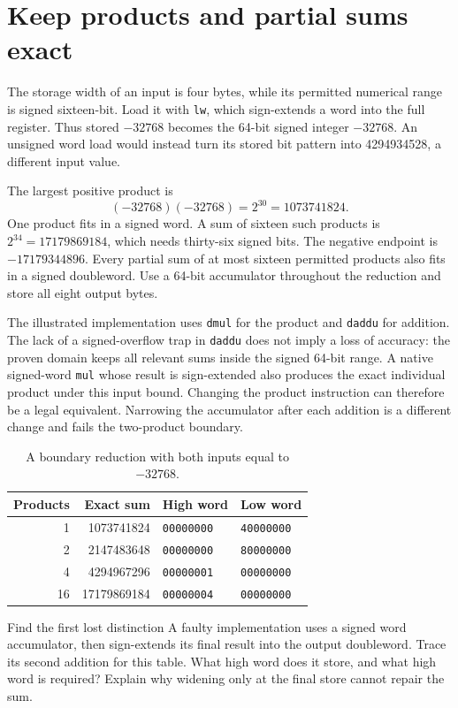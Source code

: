 \section{Keep products and partial sums exact}
The storage width of an input is four bytes, while its permitted numerical range
is signed sixteen-bit. Load it with \texttt{lw}, which sign-extends a word into
the full register. Thus stored \(-32768\) becomes the 64-bit signed integer
\(-32768\). An unsigned word load would instead turn its stored bit pattern into
4294934528, a different input value.

The largest positive product is
\[
  (-32768)(-32768)=2^{30}=1073741824.
\]
One product fits in a signed word. A sum of sixteen such products is
\(2^{34}=17179869184\), which needs thirty-six signed bits. The negative endpoint
is \(-17179344896\). Every partial sum of at most sixteen permitted products
also fits in a signed doubleword. Use a 64-bit accumulator throughout the reduction
and store all eight output bytes.

The illustrated implementation uses \texttt{dmul} for the product and
\texttt{daddu} for addition. The lack of a signed-overflow trap in \texttt{daddu}
does not imply a loss of accuracy: the proven domain keeps all relevant sums inside
the signed 64-bit range. A native signed-word \texttt{mul} whose result is sign-extended
also produces the exact individual product under this input bound. Changing the
product instruction can therefore be a legal equivalent. Narrowing the accumulator
after each addition is a different change and fails the two-product boundary.

\begin{table}[htbp]
  \centering
  \caption{A boundary reduction with both inputs equal to \(-32768\).}
  \begin{tabular}{rrll}
    \toprule
    Products & Exact sum   & High word         & Low word          \\
    \midrule
    1        & 1073741824  & \texttt{00000000} & \texttt{40000000} \\
    2        & 2147483648  & \texttt{00000000} & \texttt{80000000} \\
    4        & 4294967296  & \texttt{00000001} & \texttt{00000000} \\
    16       & 17179869184 & \texttt{00000004} & \texttt{00000000} \\
    \bottomrule
  \end{tabular}
\end{table}

\begin{MARSExercise}{Find the first lost distinction}
  A faulty implementation uses a signed word accumulator, then sign-extends its
  final result into the output doubleword. Trace its second addition for this table.
  What high word does it store, and what high word is required? Explain why widening
  only at the final store cannot repair the sum.
\end{MARSExercise}
